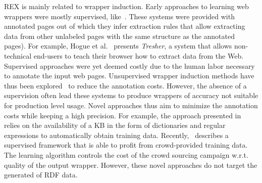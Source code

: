 REX is mainly related to wrapper induction. 
Early approaches to learning web wrappers were mostly supervised, like~\cite{flesca2004web,Hogue:2005:TAU:1060745.1060762}. 
These systems were provided with annotated pages out of which they infer extraction rules that allow extracting data from other unlabeled pages with the same structure as the annotated pages). 
For example, Hogue et al.~\cite{Hogue:2005:TAU:1060745.1060762} presents \emph{Tresher}, a system that allows non-technical end-users to teach their browser how to extract data from the Web. 
Supervised approaches were yet deemed costly due to the human labor necessary to annotate the input web pages. 
Unsupervised wrapper induction methods have thus been explored~\cite{exalg,DBLP:journals/aai/CrescenziM08} to reduce the annotation costs. 
However, the absence of a supervision often lead these systems to produce wrappers of accuracy not suitable for production level usage.
Novel approaches thus aim to minimize the annotation costs while keeping a high precision.
For example, the approach presented in~\cite{Dalvi:2011:AWL:1938545.1938547} relies on the availability of a  \ac{KB} in the form of dictionaries and regular expressions to automatically obtain training data. 
Recently, \cite{Crescenzi2013}~describes a supervised framework that is able to profit from crowd-provided training data. 
The learning algorithm controls the cost of the crowd sourcing campaign w.r.t. quality of the output wrapper.
However, these novel approaches do not target the generated of \ac{RDF} data.



